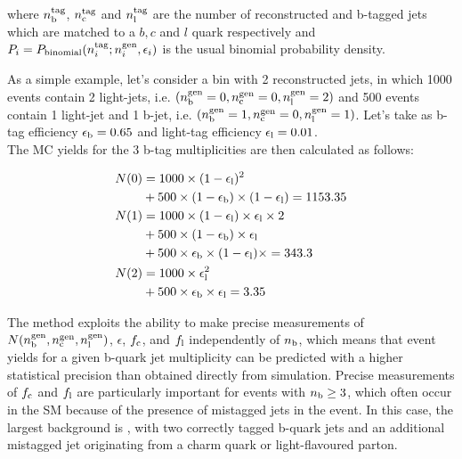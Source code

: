 where $n_{\rm b}^{\rm tag}$, $n_{\rm c}^{\rm tag}$ and $n_{\rm l}^{\rm tag}$ are the number of reconstructed and b-tagged jets 
which are matched to a $b,c$ and $l$ quark respectively and 
$P_{i} = P_{\mathrm{binomial}}(n_{i}^{\rm tag}; n_{i}^{\rm gen}, \epsilon_{i})$ is the usual binomial probability density.

As a simple example, let's consider a bin with 2 reconstructed jets, in which 
1000 events contain 2 light-jets, i.e. $(n_{\rm b}^{\rm gen} = 0,n_{\rm c}^{\rm gen} = 0,n_{\rm l}^{\rm gen} = 2)$ and 
500 events contain 1 light-jet and 1 b-jet, i.e. $(n_{\rm b}^{\rm gen} = 1,n_{\rm c}^{\rm gen} = 0,n_{\rm l}^{\rm gen} = 1)$. 
Let's take as b-tag efficiency $\epsilon_{\rm b} = 0.65$ and light-tag efficiency $\epsilon_{\rm l} = 0.01$.\\
The MC yields for the 3 b-tag multiplicities are then calculated as follows:

\begin{align*}
N(0) &= 1000\times (1-\epsilon_{\rm l})^2 \\
     &+ 500\times (1-\epsilon_{\rm b})\times(1-\epsilon_{\rm l}) = 1153.35 \\
N(1) &= 1000\times (1-\epsilon_{\rm l})\times \epsilon_{\rm l} \times 2 \\
     &+ 500\times (1-\epsilon_{\rm b})\times\epsilon_{\rm l} \\
     &+ 500\times \epsilon_{\rm b} \times (1-\epsilon_{\rm l})\times = 343.3 \\
N(2) &= 1000\times \epsilon_{\rm l}^2 \\
     &+ 500\times \epsilon_{\rm b} \times \epsilon_{\rm l} = 3.35 \\
\end{align*}

  
The method exploits the ability to make precise measurements of
$N(n_{\rm b}^{\rm gen},n_{\rm c}^{\rm gen},n_{\rm l}^{\rm gen})$,
$\epsilon$, $f_{\rm c}$, and $f_{\rm l}$ independently of $n_{\rm
  b}$, which means that event yields for a given b-quark jet
multiplicity can be predicted with a higher statistical precision than
obtained directly from simulation. Precise measurements of $f_{\rm c}$
and $f_{\rm l}$ are particularly important for events with $n_{\rm
  b} \geq 3$, which often occur in the SM because of the presence of
mistagged jets in the event. In this case, the largest background is
\ttbar, with two correctly tagged b-quark jets and an additional
mistagged jet originating from a charm quark or light-flavoured
parton.

